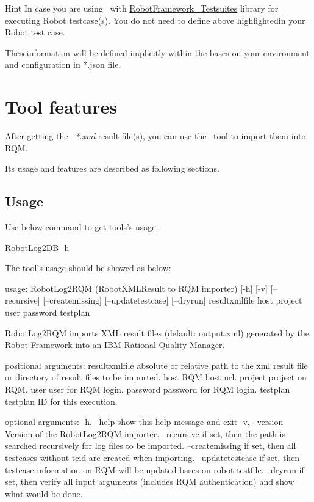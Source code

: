 \begin{boxhint} {Hint}
  In case you are using \rfw\ with 
  \href{https://github.com/test-fullautomation/robotframework-testsuitesmanagement}{RobotFramework\_Testsuites}
  library for executing Robot testcase(s). 
  You do not need to define above highlightedin your Robot test case.

  Theseinformation will be defined implicitly within the 
   bases on your environment and configuration in *.json file.
\end{boxhint}

\hypertarget{description-tool-features}{%
\section{Tool features}\label{description-tool-features}}

After getting the \rfwcore\ \emph{*.xml} result file(s), you can use the \pkg\ tool to
import them into RQM.

Its usage and features are described as following sections.

\subsection{Usage}
Use below command to get tools's usage:
\begin{robotlog}
RobotLog2DB -h
\end{robotlog}

The tool's usage should be showed as below:
\begin{robotlog}
usage: RobotLog2RQM (RobotXMLResult to RQM importer) [-h] [-v] [--recursive] 
                    [--createmissing] [--updatetestcase] [--dryrun] 
                    resultxmlfile host project user password testplan

RobotLog2RQM imports XML result files (default: output.xml) generated by the 
                  Robot Framework into an IBM Rational Quality Manager.

positional arguments:
resultxmlfile     absolute or relative path to the xml result file 
                  or directory of result files to be imported.
host              RQM host url.
project           project on RQM.
user              user for RQM login.
password          password for RQM login.
testplan          testplan ID for this execution.

optional arguments:
-h, --help        show this help message and exit
-v, --version     Version of the RobotLog2RQM importer.
--recursive       if set, then the path is searched recursively for 
                  log files to be imported.
--createmissing   if set, then all testcases without tcid are created 
                  when importing.
--updatetestcase  if set, then testcase information on RQM will be updated 
                  bases on robot testfile.
--dryrun          if set, then verify all input arguments 
                  (includes RQM authentication) and show what would be done.
\end{robotlog}

